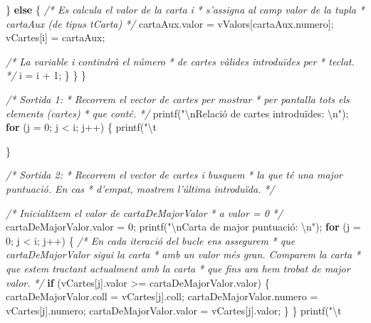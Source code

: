 \documentclass[]{book}
\newenvironment{Shaded}{\begin{snugshade}}{\end{snugshade}}
\newcommand{\DecValTok}[1]{\textcolor[rgb]{0.00,0.00,0.81}{#1}}
\newcommand{\SpecialCharTok}[1]{\textcolor[rgb]{0.00,0.00,0.00}{#1}}
\newcommand{\StringTok}[1]{\textcolor[rgb]{0.31,0.60,0.02}{#1}}
\newcommand{\CommentTok}[1]{\textcolor[rgb]{0.56,0.35,0.01}{\textit{#1}}}
\newcommand{\ControlFlowTok}[1]{\textcolor[rgb]{0.13,0.29,0.53}{\textbf{#1}}}
\newcommand{\NormalTok}[1]{#1}
\begin{document}
\begin{Shaded}
\begin{Highlighting}[]
{{\NormalTok{            \} }\ControlFlowTok{else}\NormalTok{ \{}
                \CommentTok{/* Es calcula el valor de la carta i }
\CommentTok{                 * s'assigna al camp valor de la tupla}
\CommentTok{                 * cartaAux (de tipus tCarta)}
\CommentTok{                 */}
\NormalTok{                cartaAux.valor = vValors[cartaAux.numero];}
\NormalTok{                vCartes[i] = cartaAux;}
                
                \CommentTok{/* La variable i contindrà el número}
\CommentTok{                 * de cartes vàlides introduïdes per}
\CommentTok{                 * teclat.}
\CommentTok{                 */}
\NormalTok{                i = i + }\DecValTok{1}\NormalTok{;}
\NormalTok{            \}}
\NormalTok{        \}}
\NormalTok{    \}}
    
    \CommentTok{/* Sortida 1:}
\CommentTok{     * Recorrem el vector de cartes per mostrar}
\CommentTok{     * per pantalla tots els elements (cartes)}
\CommentTok{     * que conté.}
\CommentTok{     */}
\NormalTok{    printf(}\StringTok{"}\SpecialCharTok{\textbackslash{}n}\StringTok{Relació de cartes introduïdes: }\SpecialCharTok{\textbackslash{}n}\StringTok{"}\NormalTok{);}
    \ControlFlowTok{for}\NormalTok{ (j = }\DecValTok{0}\NormalTok{; j < i; j++) \{}
\NormalTok{        printf(}\StringTok{"}\SpecialCharTok{\textbackslash{}t}\StringTok{%
\NormalTok{    \}}
    
    \CommentTok{/* Sortida 2:}
\CommentTok{     * Recorrem el vector de cartes i busquem}
\CommentTok{     * la que té una major puntuació. En cas }
\CommentTok{     * d'empat, mostrem l'última introduïda.}
\CommentTok{     */}

    \CommentTok{/* Inicialitzem el valor de cartaDeMajorValor}
\CommentTok{     * a valor = 0}
\CommentTok{     */}
\NormalTok{    cartaDeMajorValor.valor = }\DecValTok{0}\NormalTok{;}
\NormalTok{    printf(}\StringTok{"}\SpecialCharTok{\textbackslash{}n}\StringTok{Carta de major puntuació: }\SpecialCharTok{\textbackslash{}n}\StringTok{"}\NormalTok{);}
    \ControlFlowTok{for}\NormalTok{ (j = }\DecValTok{0}\NormalTok{; j < i; j++) \{}
        \CommentTok{/* En cada iteració del bucle ens assegurem}
\CommentTok{         * que cartaDeMajorValor sigui la carta}
\CommentTok{         * amb un valor més gran. Comparem la carta}
\CommentTok{         * que estem tractant actualment amb la carta}
\CommentTok{         * que fins ara hem trobat de major valor.}
\CommentTok{         */}
        \ControlFlowTok{if}\NormalTok{ (vCartes[j].valor >= cartaDeMajorValor.valor) \{}
\NormalTok{            cartaDeMajorValor.coll = vCartes[j].coll;}
\NormalTok{            cartaDeMajorValor.numero = vCartes[j].numero;}
\NormalTok{            cartaDeMajorValor.valor = vCartes[j].valor;}
\NormalTok{        \}}
\NormalTok{    \}}
\NormalTok{    printf(}\StringTok{"}\SpecialCharTok{\textbackslash{}t}\StringTok{%

}}}}
\end{Highlighting}
\end{Shaded}
\end{document}
